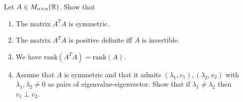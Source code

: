 \documentclass[12pt]{article}
\begin{document}
\begin{problem}{}{}
    Let $A \in M_{n \times n}(\mathbb{R})$. Show that
    \begin{enumerate}[label=\alph*)]
        \item The matrix $A^TA$ is symmetric.
        \item The matrix $A^TA$ is positive definite iff $A$ is invertible.
        \item We have $\mathrm{rank}(A^TA) = \mathrm{rank}(A)$.
        \item Assume that $A$ is symmetric and that it admits $(\lambda_1,v_1), (\lambda_2,v_2)$ with $\lambda_1,\lambda_2 \neq 0$ as pairs of eigenvalue-eigenvector. Show that if $\lambda_1 \neq \lambda_2$ then $v_1 \perp v_2$.
    \end{enumerate}
\end{problem}
\end{document}
